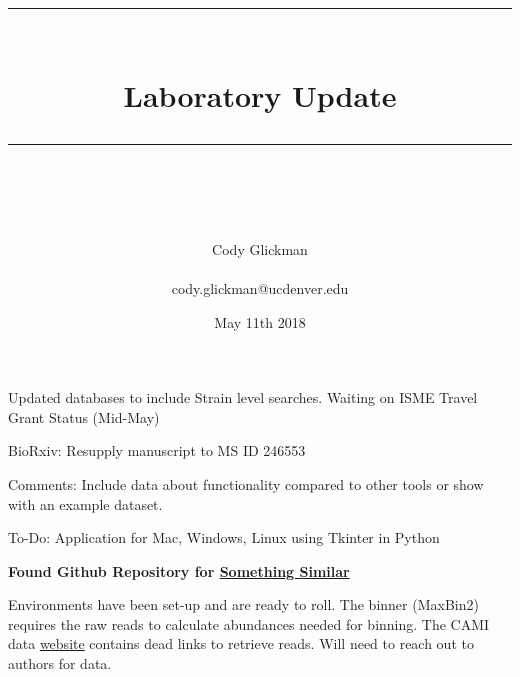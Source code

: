 \documentclass[idxtotoc,hyperref,openany]{labbook} %
\newcommand{\HRule}{\rule{\linewidth}{0.5mm}} %
\begin{document}

\frontmatter %
\title{
\begin{center}
\HRule \\[0.4cm]
{\Huge \bfseries Laboratory Update \\[0.5cm] \Large} %
\HRule \\[1.5cm]
\end{center}
}
\author{\Huge Cody Glickman \\ \\ \LARGE cody.glickman@ucdenver.edu \\[2cm]} %
\date{May 11th 2018} %
\maketitle

\tableofcontents

\mainmatter %




Updated databases to include Strain level searches. Waiting on ISME Travel Grant Status (Mid-May)

BioRxiv: Resupply manuscript to MS ID 246553 

Comments: Include data about functionality compared to other tools or show with an example dataset.

To-Do: Application for Mac, Windows, Linux using Tkinter in Python

\textbf{Found Github Repository for \href{https://github.com/kblin/ncbi-genome-download}{Something Similar} }



Environments have been set-up and are ready to roll. The binner (MaxBin2) requires the raw reads to calculate abundances needed for binning. The CAMI data \href{https://storage.googleapis.com/cami-data-eu/CAMI_low/RL_S001__insert_270.fq.gz}{website} contains dead links to retrieve reads. Will need to reach out to authors for data.  
\end{document}
